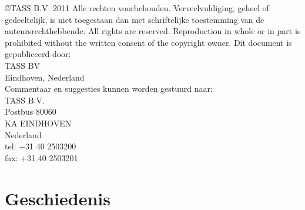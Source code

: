 \documentclass[]{article}
\begin{document}
\vspace*{\fill}

\newpage

\noindent\copyright  TASS B.V. 2011
Alle rechten voorbehouden. Verveelvuldiging, geheel of gedeeltelijk, is
niet toegestaan dan met schriftelijke toestemming van de
auteursrechthebbende.
All rights are reserved. Reproduction in whole or in part is prohibited
without the written consent of the copyright owner. Dit document is
gepubliceerd door:\\
TASS BV\\
Eindhoven, Nederland\\

\noindent Commentaar en suggesties kunnen worden gestuurd naar:\\
\indent TASS B.V.\\
\indent\indent Postbus 80060\\
\indent{} KA  EINDHOVEN\\
\indent\indent Nederland\\
\indent\indent tel:  +31 40 2503200\\
\indent\indent fax:  +31 40 2503201\\

\vspace*{\fill}

\section*{Geschiedenis}
\end{document}

